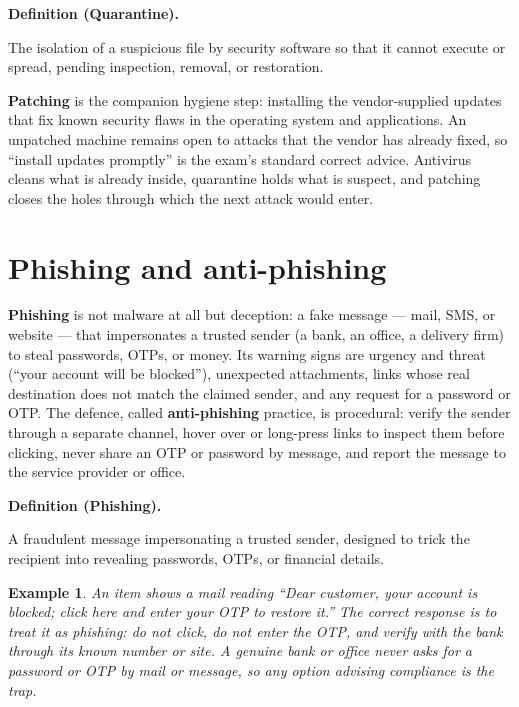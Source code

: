 \documentclass[11pt]{article}
\newtheorem{example}{Example}[section]
\newenvironment{definitionbox}[1]{%
  \par\noindent\textbf{Definition (#1).}\ \itshape
}{\par\vspace{0.3em}}
\begin{document}
\begin{definitionbox}{Quarantine}
The isolation of a suspicious file by security software so that it cannot
execute or spread, pending inspection, removal, or restoration.
\end{definitionbox}

\textbf{Patching} is the companion hygiene step: installing the
vendor-supplied updates that fix known security flaws in the operating
system and applications. An unpatched machine remains open to attacks that
the vendor has already fixed, so ``install updates promptly'' is the exam's
standard correct advice. Antivirus cleans what is already inside,
quarantine holds what is suspect, and patching closes the holes through
which the next attack would enter.

\section{Phishing and anti-phishing}
\textbf{Phishing} is not malware at all but deception: a fake message ---
mail, SMS, or website --- that impersonates a trusted sender (a bank, an
office, a delivery firm) to steal passwords, OTPs, or money. Its warning
signs are urgency and threat (``your account will be blocked''), unexpected
attachments, links whose real destination does not match the claimed
sender, and any request for a password or OTP. The defence, called
\textbf{anti-phishing} practice, is procedural: verify the sender through a
separate channel, hover over or long-press links to inspect them before
clicking, never share an OTP or password by message, and report the message
to the service provider or office.

\begin{definitionbox}{Phishing}
A fraudulent message impersonating a trusted sender, designed to trick the
recipient into revealing passwords, OTPs, or financial details.
\end{definitionbox}

\begin{example}
An item shows a mail reading ``Dear customer, your account is blocked;
click here and enter your OTP to restore it.'' The correct response is to
treat it as phishing: do not click, do not enter the OTP, and verify with
the bank through its known number or site. A genuine bank or office never
asks for a password or OTP by mail or message, so any option advising
compliance is the trap.
\end{example}
\end{document}
